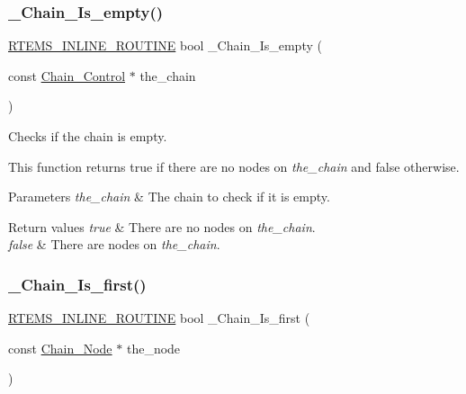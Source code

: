 \subsubsection{\texorpdfstring{\_Chain\_Is\_empty()}{\_Chain\_Is\_empty()}}
{\footnotesize\ttfamily \mbox{\hyperlink{group__RTEMSScoreBaseDefs_gac216239df231d5dbd15e3520b0b9313f}{R\+T\+E\+M\+S\+\_\+\+I\+N\+L\+I\+N\+E\+\_\+\+R\+O\+U\+T\+I\+NE}} bool \+\_\+\+Chain\+\_\+\+Is\+\_\+empty (\begin{DoxyParamCaption}\item[{const \mbox{\hyperlink{unionChain__Control}{Chain\+\_\+\+Control}} $\ast$}]{the\+\_\+chain }\end{DoxyParamCaption})}



Checks if the chain is empty. 

This function returns true if there are no nodes on {\itshape the\+\_\+chain} and false otherwise.


\begin{DoxyParams}{Parameters}
{\em the\+\_\+chain} & The chain to check if it is empty.\\
\hline
\end{DoxyParams}

\begin{DoxyRetVals}{Return values}
{\em true} & There are no nodes on {\itshape the\+\_\+chain}. \\
\hline
{\em false} & There are nodes on {\itshape the\+\_\+chain}. \\
\hline
\end{DoxyRetVals}
\mbox{\label{group__RTEMSScoreChain_ga47c4ae692b2752899ac0ac3515fbf985}} 
\subsubsection{\texorpdfstring{\_Chain\_Is\_first()}{\_Chain\_Is\_first()}}
{\footnotesize\ttfamily \mbox{\hyperlink{group__RTEMSScoreBaseDefs_gac216239df231d5dbd15e3520b0b9313f}{R\+T\+E\+M\+S\+\_\+\+I\+N\+L\+I\+N\+E\+\_\+\+R\+O\+U\+T\+I\+NE}} bool \+\_\+\+Chain\+\_\+\+Is\+\_\+first (\begin{DoxyParamCaption}\item[{const \mbox{\hyperlink{group__RTEMSScoreChain_ga0dd4bfcca1ac7f90de2842e447846d3d}{Chain\+\_\+\+Node}} $\ast$}]{the\+\_\+node }\end{DoxyParamCaption})}



